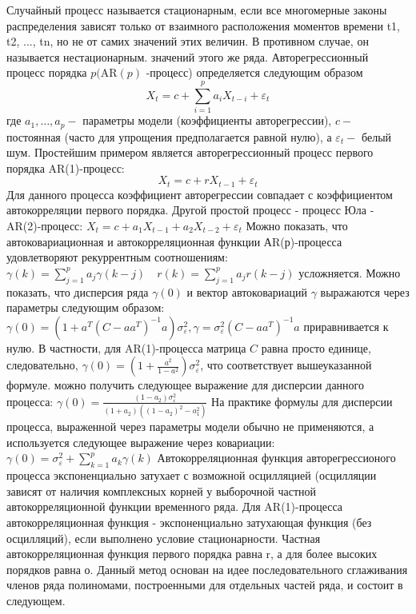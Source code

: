 \documentclass[a4paper, 12pt]{article}
\begin{document}
	Случайный процесс называется стационарным, если все многомерные законы распределения зависят только от взаимного расположения моментов
	времени t1, t2, ..., tn, но не от самих значений этих величин. В противном случае, он называется нестационарным.
	значений этого же ряда. Авторегрессионный процесс порядка $p(\mathrm{AR}(p)$ -процесс) определяется следующим образом
	$$
	X_{t}=c+\sum_{i=1}^{p} a_{i} X_{t-i}+\varepsilon_{t}
	$$
	где $a_{1}, \ldots, a_{p}-$ параметры модели (коэффициенты авторегрессии), $c-$ постоянная (часто для упрощения предполагается равной нулю), а $\varepsilon_{t}-$ белый шум.
	Простейшим примером является авторегрессионный процесс первого порядка AR(1)-процесс:
	$$
	X_{t}=c+r X_{t-1}+\varepsilon_{t}
	$$
	Для данного процесса коэффициент авторегрессии совпадает с коэффициентом автокорреляции первого порядка.
	Другой простой процесс - процесс Юла - AR(2)-процесс:
	$X_{t}=c+a_{1} X_{t-1}+a_{2} X_{t-2}+\varepsilon_{t}$
	Можно показать, что автоковариационная и автокорреляционная функции АR(р)-процесса удовлетворяют рекуррентным соотношениям:
	$\gamma(k)=\sum_{j=1}^{p} a_{j} \gamma(k-j) \quad r(k)=\sum_{j=1}^{p} a_{j} r(k-j)$
	усложняется. Можно показать, что дисперсия ряда $\gamma(0)$ и вектор автоковариаций $\gamma$ выражаются через параметры следующим образом:
	$\gamma(0)=\left(1+a^{T}\left(C-a a^{T}\right)^{-1} a\right) \sigma_{\varepsilon}^{2}, \gamma=\sigma_{\varepsilon}^{2}\left(C-a a^{T}\right)^{-1} a$
	приравнивается к нулю.
	В частности, для AR(1)-процесса матрица $C$ равна просто единице, следовательно, $\gamma(0)=\left(1+\frac{a^{2}}{1-a^{2}}\right) \sigma_{\varepsilon}^{2}$, что соответствует вышеуказанной формуле.
	можно получить следующее выражение для дисперсии данного процесса:
	$\gamma(0)=\frac{\left(1-a_{2}\right) \sigma_{\varepsilon}^{2}}{\left(1+a_{2}\right)\left(\left(1-a_{2}\right)^{2}-a_{1}^{2}\right)}$
	На практике формулы для дисперсии процесса, выраженной через параметры модели обычно не применяются, а используется следующее выражение через ковариации:
	$\gamma(0)=\sigma_{\varepsilon}^{2}+\sum_{k=1}^{p} a_{k} \gamma(k)$
	Автокорреляционная функция авторегрессионого процесса экспоненциально затухает с возможной осцилляцией (осцилляции зависят от наличия комплексных корней у
	выборочной частной автокорреляционной функции временного ряда.
	Для AR(1)-процесса автокорреляционная функция - экспоненциально затухающая функция (без осцилляций), если выполнено условие стационарности. Частная автокорреляционная функция первого порядка равна r, а для более высоких порядков равна о.
	Данный метод основан на идее последовательного сглаживания членов ряда полиномами, построенными для отдельных частей ряда, и состоит в следующем.
\end{document}
